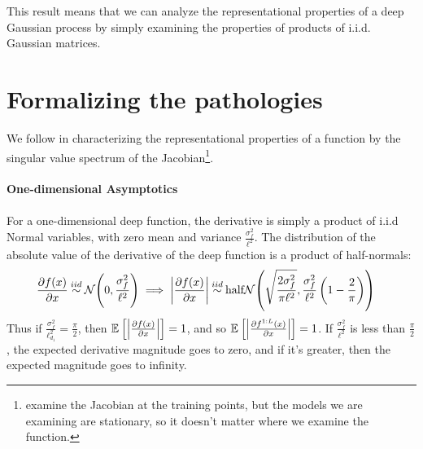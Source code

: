 \documentclass{article}
\begin{document}
This result means that we can analyze the representational properties of a deep Gaussian process by simply examining the properties of products of i.i.d. Gaussian matrices.

\section{Formalizing the pathologies}


We follow \cite{rifai2011contractive} in characterizing the representational properties of a function by the singular value spectrum of the Jacobian\footnote{ \cite{rifai2011contractive} examine the Jacobian at the training points, but the models we are examining are stationary, so it doesn't matter where we examine the function.}.  

\paragraph{One-dimensional Asymptotics}

For a one-dimensional deep function, the derivative is simply a product of i.i.d Normal variables, with zero mean and variance $\frac{\sigma^2_f}{\ell^2}$.  The distribution of the absolute value of the derivative of the deep function is a product of half-normals:
%
\begin{align}
\frac{\partial f(x)}{\partial x} \distas{iid} \Nt{0}{\frac{\sigma^2_f}{\ell^2}} \implies 
\left| \frac{\partial f(x)}{\partial x} \right| & \distas{iid} \textnormal{half}\Nt{\sqrt{\frac{2 \sigma^2_f}{\pi\ell^2}}}{\frac{\sigma^2_f}{\ell^2} \left( 1 - \frac{2}{\pi} \right)}
\end{align}
%
Thus if $\frac{\sigma^2_f}{\ell_{d_1}^2} = \frac{\pi}{2}$, then $\mathbb{E}_{} \left[ {\left| \frac{\partial f(x)}{\partial x} \right|} \right] = 1$, and so $\mathbb{E}_{} \left[ {\left| \frac{\partial f^{1:L}(x)}{\partial x} \right|} \right] = 1$.  If $\frac{\sigma^2_f}{\ell^2}$ is less than $\frac{\pi}{2}$, the expected derivative magnitude goes to zero, and if it's greater, then the expected magnitude goes to infinity.  
\end{document}
